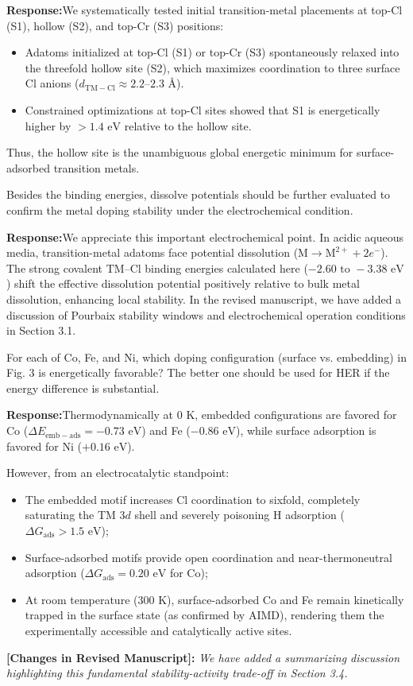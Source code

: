 \documentclass[11pt, sans, a4paper]{moderncv}
\newcommand{\response}{\vspace{0.4em}\noindent\textbf{\color{actionblue}Response:}\hspace{0.5em}}
\newcommand{\manuscriptchange}[1]{\vspace{0.3em}\noindent\textbf{\color{acsblue}[Changes in Revised Manuscript]:} \textit{#1}\vspace{0.4em}}
\begin{document}
\response We systematically tested initial transition-metal placements at top-Cl (S1), hollow (S2), and top-Cr (S3) positions:
\begin{itemize}[leftmargin=1.5em, itemsep=0.2em]
    \item Adatoms initialized at top-Cl (S1) or top-Cr (S3) spontaneously relaxed into the threefold hollow site (S2), which maximizes coordination to three surface Cl anions ($d_{\mathrm{TM-Cl}} \approx 2.2\text{--}2.3\text{ \AA}$).
    \item Constrained optimizations at top-Cl sites showed that S1 is energetically higher by $>1.4\text{ eV}$ relative to the hollow site.
\end{itemize}
Thus, the hollow site is the unambiguous global energetic minimum for surface-adsorbed transition metals.

\begin{reviewercomment}
Besides the binding energies, dissolve potentials should be further evaluated to confirm the metal doping stability under the electrochemical condition.
\end{reviewercomment}

\response We appreciate this important electrochemical point. In acidic aqueous media, transition-metal adatoms face potential dissolution ($\text{M} \rightarrow \text{M}^{2+} + 2e^-$). The strong covalent $\text{TM--Cl}$ binding energies calculated here ($-2.60\text{ to } -3.38\text{ eV}$) shift the effective dissolution potential positively relative to bulk metal dissolution, enhancing local stability. In the revised manuscript, we have added a discussion of Pourbaix stability windows and electrochemical operation conditions in Section 3.1.

\begin{reviewercomment}
For each of Co, Fe, and Ni, which doping configuration (surface vs. embedding) in Fig. 3 is energetically favorable? The better one should be used for HER if the energy difference is substantial.
\end{reviewercomment}

\response Thermodynamically at $0\text{ K}$, embedded configurations are favored for Co ($\Delta E_{\mathrm{emb-ads}} = -0.73\text{ eV}$) and Fe ($-0.86\text{ eV}$), while surface adsorption is favored for Ni ($+0.16\text{ eV}$). 

However, from an electrocatalytic standpoint:
\begin{itemize}[leftmargin=1.5em, itemsep=0.2em]
    \item The embedded motif increases Cl coordination to sixfold, completely saturating the TM $3d$ shell and severely poisoning H adsorption ($\Delta G_{\mathrm{ads}} > 1.5\text{ eV}$);
    \item Surface-adsorbed motifs provide open coordination and near-thermoneutral adsorption ($\Delta G_{\mathrm{ads}} = 0.20\text{ eV}$ for Co);
    \item At room temperature ($300\text{ K}$), surface-adsorbed Co and Fe remain kinetically trapped in the surface state (as confirmed by AIMD), rendering them the experimentally accessible and catalytically active sites.
\end{itemize}

\manuscriptchange{We have added a summarizing discussion highlighting this fundamental stability-activity trade-off in Section 3.4.}
\end{document}
